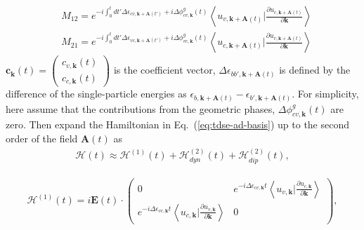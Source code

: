 \begin{align}
       & M_{12} = e^{-i\int^t_0dt' \Delta \epsilon_{cv,\mathbf k+ \mathbf A(t')}+i \Delta \phi^g_{cv,\mathbf k}(t)} 
  \left \langle u_{v,\mathbf k+\mathbf A(t)}\Big |\frac{\partial u_{c,\mathbf k+\mathbf A(t)}}{\partial
  \mathbf k} \right \rangle\\ 
       &  M_{21} = e^{-i\int^t_0dt' \Delta \epsilon_{vc,\mathbf k+ \mathbf A(t')}+i \Delta \phi^g_{vc,\mathbf k}(t)} 
  \left \langle u_{c,\mathbf k+\mathbf A(t)}\Big |\frac{\partial u_{v,\mathbf k+\mathbf A(t)}}{\partial
  \mathbf k} \right \rangle
\end{align}
$\mathbf c_{\mathbf k}(t) = \left(
    \begin{array}{cc}
      c_{v,\mathbf k}(t) \\
      c_{c,\mathbf k}(t)
    \end{array}
    \right)$ is the coefficient vector,  $\Delta\epsilon_{bb',\mathbf k+ \mathbf A(t)}$ is defined by the difference of the single-particle energies as $\epsilon_{b,\mathbf k+ \mathbf A(t)}-\epsilon_{b',\mathbf k+ \mathbf A(t)}$. For simplicity, here assume that the contributions from the geometric phases, $\Delta \phi^g_{cv,\mathbf k}(t)$ are zero. Then expand the Hamiltonian in Eq.~(\ref{eq:tdse-ad-basis}) up to the second order of the field $\mathbf A(t)$ as
\begin{align}
\mathcal{H}(t)\approx \mathcal{H}^{(1)}(t) + \mathcal{H}^{(2)}_{dyn}(t) + \mathcal{H}^{(2)}_{dip}(t),
\end{align}

\begin{align}
\mathcal{H}^{(1)}(t) = i \mathbf E(t)\cdot 
\left(
    \begin{array}{cc}
      0 & 
      e^{-i \Delta \epsilon_{cv,\mathbf k}t} 
  \left \langle u_{v,\mathbf k}\Big |\frac{\partial u_{c,\mathbf k}}{\partial \mathbf k} \right \rangle \\
      e^{-i\Delta \epsilon_{vc,\mathbf k}t}
  \left \langle u_{c,\mathbf k}\Big |\frac{\partial u_{v,\mathbf k}}{\partial \mathbf k} \right \rangle &
      0
    \end{array}
    \right),
\end{align}

